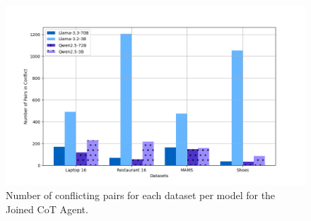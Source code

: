 \documentclass[11pt]{article}
\begin{document}


\begin{figure}
    \centering
    \includegraphics[width=0.9\linewidth]{figures/labels_confl_new.png}
    \caption{Number of conflicting pairs for each dataset per model for the Joined CoT Agent.}
    \label{fig:labels_confl}
\end{figure}

\clearpage


\clearpage
\end{document}
